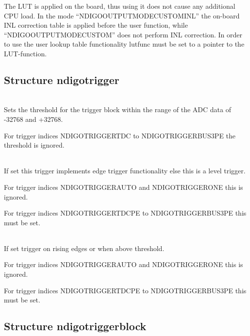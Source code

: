             The LUT is applied on the board, thus using it does not cause any additional CPU load. In the mode ``\textsf{NDIGO\tu OUTPUT\tu MODE\tu CUSTOM\tu INL}'' the on-board INL correction table is applied before the user function, while ``\textsf{NDIGO\tu OUTPUT\tu MODE\tu CUSTOM}'' does not perform INL correction. In order to use the user lookup table functionality \textsf{lut\tu func} must be set to a pointer to the LUT-function.

        \subsection{Structure ndigo\tu trigger}

            \\
            Sets the threshold for the trigger block within the range of the ADC data of -32768 and +32768.\par

            For trigger indices \textsf{NDIGO\tu TRIGGER\tu TDC} to \textsf{NDIGO\tu TRIGGER\tu BUS3\tu PE} the threshold is ignored.\par

            \\
            If set this trigger implements edge trigger functionality else this is a level trigger.\par

            For trigger indices \textsf{NDIGO\tu TRIGGER\tu AUTO} and \textsf{NDIGO\tu TRIGGER\tu ONE} this is ignored.\par

            For trigger indices \textsf{NDIGO\tu TRIGGER\tu TDC\tu PE} to \textsf{NDIGO\tu TRIGGER\tu BUS3\tu PE} this must be set.\par

            \\
            If set trigger on rising edges or when above threshold.\par

            For trigger indices \textsf{NDIGO\tu TRIGGER\tu AUTO} and \textsf{NDIGO\tu TRIGGER\tu ONE} this is ignored.\par

            For trigger indices \textsf{NDIGO\tu TRIGGER\tu TDC\tu PE} to \textsf{NDIGO\tu TRIGGER\tu BUS3\tu PE} this must be set.

        \subsection{Structure ndigo\tu trigger\tu block\label{cp:triggerblock}}

